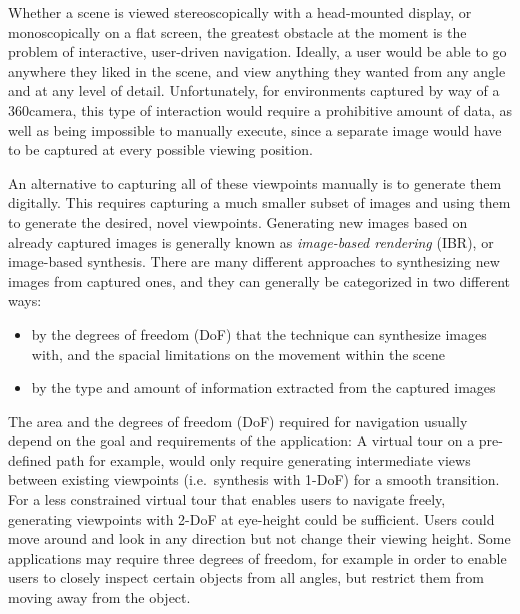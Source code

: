 Whether a scene is viewed stereoscopically with a head-mounted display, or monoscopically on a flat screen, the greatest obstacle at the moment is the problem of interactive, user-driven navigation. Ideally, a user would be able to go anywhere they liked in the scene, and view anything they wanted from any angle and at any level of detail. Unfortunately, for environments captured by way of a 360\degree camera, this type of interaction would require a prohibitive amount of data, as well as being impossible to manually execute, since a separate image would have to be captured at every possible viewing position.

An alternative to capturing all of these viewpoints manually is to generate them digitally. This requires capturing a much smaller subset of images and using them to generate the desired, novel viewpoints. Generating new images based on already captured images is generally known as \emph{image-based rendering} (IBR), or image-based synthesis. There are many different approaches to synthesizing new images from captured ones, and they can generally be categorized in two different ways:
\begin{itemize}
  \item by the degrees of freedom (DoF) that the technique can synthesize images with, and the spacial limitations on the movement within the scene
  \item by the type and amount of information extracted from the captured images
\end{itemize}

The area and the degrees of freedom (DoF) required for navigation usually depend on the goal and requirements of the application: A virtual tour on a pre-defined path for example, would only require generating intermediate views between existing viewpoints (i.e.\ synthesis with 1-DoF) for a smooth transition. For a less constrained virtual tour that enables users to navigate freely, generating viewpoints with 2-DoF at eye-height could be sufficient. Users could move around and look in any direction but not change their viewing height. Some applications may require three degrees of freedom, for example in order to enable users to closely inspect certain objects from all angles, but restrict them from moving away from the object.


